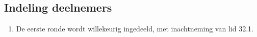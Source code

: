 \subsection{Indeling deelnemers}

\begin{enumerate}
\item De eerste ronde wordt willekeurig ingedeeld, met inachtneming van lid 32.1.
\end{enumerate}
